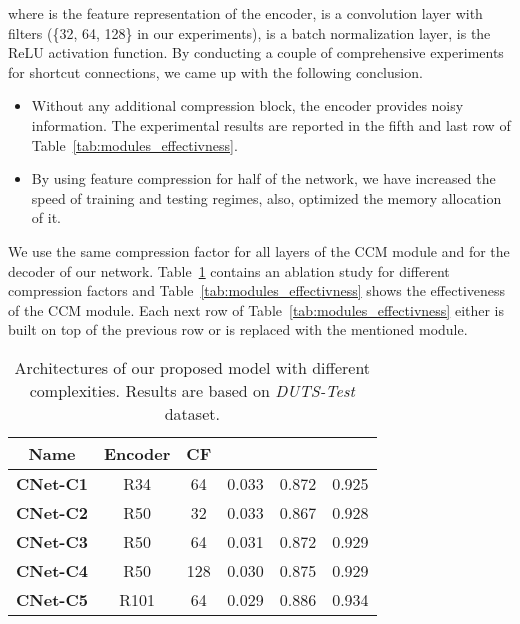 \documentclass[10pt,twocolumn,letterpaper]{article}
\begin{document}
where  is the feature representation of the encoder,  is a convolution layer with  filters (\{32, 64, 128\} in our experiments),  is a batch normalization layer,  is the ReLU activation function. By conducting a couple of comprehensive experiments for shortcut connections, we came up with the following conclusion.

\begin{itemize}
  \item Without any additional compression block, the encoder provides noisy information. The experimental results are reported in the fifth and last row of Table~\ref{tab:modules_effectivness}.
  \item By using feature compression for half of the network, we have increased the speed of training and testing regimes, also, optimized the memory allocation of it.
\end{itemize}

We use the same compression factor for all layers of the CCM module and for the decoder of our network. Table~\ref{tab:model_architectures} contains an ablation study for different compression factors and Table~\ref{tab:modules_effectivness} shows the effectiveness of the CCM module. Each next row of Table~\ref{tab:modules_effectivness} either is built on top of the previous row or is replaced with the mentioned module. 

\begin{table}
\begin{center}
\begin{tabular}{|c|c|c|c|c|c|}
\hline
Name & Encoder & CF &  &  &  \\
\hline\hline\rule{0pt}{2.2ex}
\textbf{CNet-C1} & R34 & 64 & 0.033 & 0.872 & 0.925 \\
\textbf{CNet-C2} & R50 & 32 & 0.033 & 0.867 & 0.928 \\
\textbf{CNet-C3} & R50 & 64 & 0.031 & 0.872 & 0.929 \\
\textbf{CNet-C4} & R50 & 128 & 0.030 & 0.875 & 0.929 \\
\textbf{CNet-C5} & R101 & 64 & 0.029 & 0.886 & 0.934 \\
\hline
\end{tabular}
\end{center}
\caption{Architectures of our proposed model with different complexities. Results are based on \textit{DUTS-Test} dataset.}
\label{tab:model_architectures}
\end{table}
\end{document}
